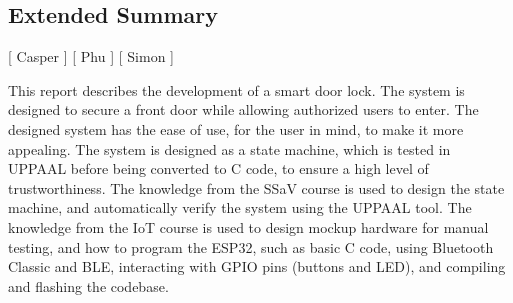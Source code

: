 \subsection*{Extended Summary}
[ Casper ] [ Phu ] [ Simon ] 
\newline

This report describes the development of a smart door lock.
The system is designed to secure a front door while allowing authorized users to enter.
The designed system has the ease of use, for the user in mind, to make it more appealing.
The system is designed as a state machine, which is tested in UPPAAL before being converted to C code, to ensure a high level of trustworthiness.
The knowledge from the SSaV course is used to design the state machine, and automatically verify the system using the UPPAAL tool.
The knowledge from the IoT course is used to design mockup hardware for manual testing, and how to program the ESP32, such as basic C code, using Bluetooth Classic and BLE, interacting with GPIO pins (buttons and LED), and compiling and flashing the codebase.
